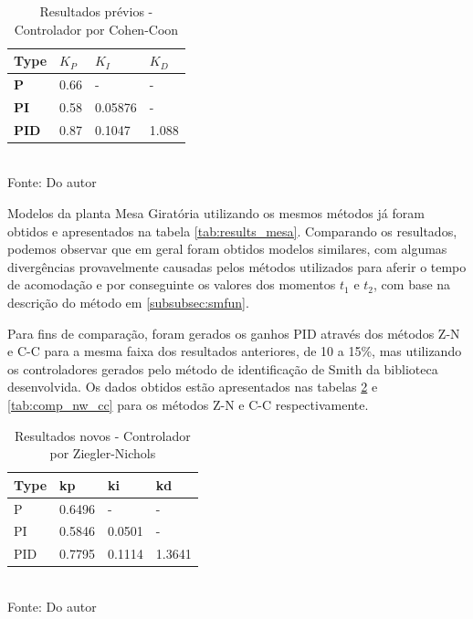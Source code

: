 \begin{table}[H]
    \caption{Resultados prévios - Controlador por Cohen-Coon}
    \centering
    \begin{tabular}{|l|l|l|l|}
        \hline
        \textbf{Type} & \textbf{$K_P$} & \textbf{$K_I$} & \textbf{$K_D$} \\
        \hline
        \textbf{P}    & 0.66           & -              & -              \\
        \hline
        \textbf{PI}   & 0.58           & 0.05876        & -              \\
        \hline
        \textbf{PID}  & 0.87           & 0.1047         & 1.088          \\
        \hline
    \end{tabular}
    \label{tab:comp_prev_cc}
    \\
    \vspace{0cm}\hspace{0cm}\small{Fonte: Do autor}
\end{table}

Modelos da planta Mesa Giratória utilizando os mesmos métodos já foram obtidos e apresentados na tabela
\ref{tab:results_mesa}.
Comparando os resultados, podemos observar que em geral foram obtidos modelos similares, com algumas divergências
provavelmente causadas pelos métodos utilizados para aferir o tempo de acomodação e por conseguinte os valores dos
momentos $t_1$ e $t_2$, com base na descrição do método em \ref{subsubsec:smfun}.

Para fins de comparação, foram gerados os ganhos PID através dos métodos Z-N e C-C para a mesma faixa dos resultados
anteriores, de 10 a 15\%, mas utilizando os controladores gerados pelo método de identificação de Smith da biblioteca
desenvolvida.
Os dados obtidos estão apresentados nas tabelas \ref{tab:comp_nw_zn} e \ref{tab:comp_nw_cc} para os métodos
Z-N e C-C respectivamente.


\begin{table}[H]
    \caption{Resultados novos - Controlador por Ziegler-Nichols}
    \centering
    \begin{tabular}{|l|l|l|l|}
        \hline
        \textbf{Type} & \textbf{kp} & \textbf{ki} & \textbf{kd} \\
        \hline
        P             & 0.6496      & -           & -           \\
        \hline
        PI            & 0.5846      & 0.0501      & -           \\
        \hline
        PID           & 0.7795      & 0.1114      & 1.3641      \\
        \hline
    \end{tabular}
    \label{tab:comp_nw_zn}
    \\
    \vspace{0cm}\hspace{0cm}\small{Fonte: Do autor}
\end{table}


